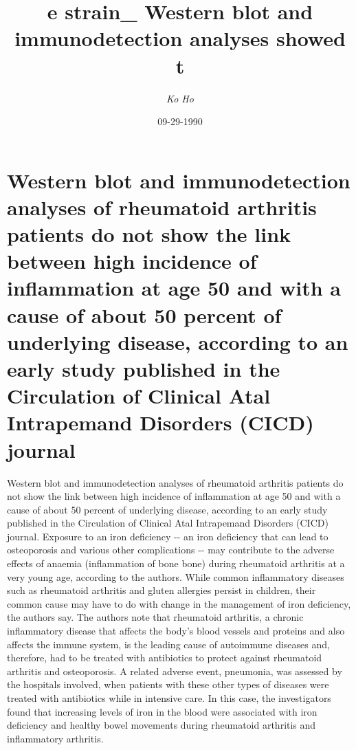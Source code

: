 \documentclass{article}%
\title{e strain\_ Western blot and immunodetection analyses showed t}%
\author{\textit{Ko Ho}}%
\date{09-29-1990}%
\begin{document}
%
\normalsize%
\maketitle%
\section{Western blot and immunodetection analyses of rheumatoid arthritis patients do not show the link between high incidence of inflammation at age 50 and with a cause of about 50 percent of underlying disease, according to an early study published in the Circulation of Clinical Atal Intrapemand Disorders (CICD) journal}%
\label{sec:Westernblotandimmunodetectionanalysesofrheumatoidarthritispatientsdonotshowthelinkbetweenhighincidenceofinflammationatage50andwithacauseofabout50percentofunderlyingdisease,accordingtoanearlystudypublishedintheCirculationofClinicalAtalIntrapemandDisorders(CICD)journal}%
Western blot and immunodetection analyses of rheumatoid arthritis patients do not show the link between high incidence of inflammation at age 50 and with a cause of about 50 percent of underlying disease, according to an early study published in the Circulation of Clinical Atal Intrapemand Disorders (CICD) journal.\newline%
Exposure to an iron deficiency {-}{-} an iron deficiency that can lead to osteoporosis and various other complications {-}{-} may contribute to the adverse effects of anaemia (inflammation of bone bone) during rheumatoid arthritis at a very young age, according to the authors.\newline%
While common inflammatory diseases such as rheumatoid arthritis and gluten allergies persist in children, their common cause may have to do with change in the management of iron deficiency, the authors say.\newline%
The authors note that rheumatoid arthritis, a chronic inflammatory disease that affects the body's blood vessels and proteins and also affects the immune system, is the leading cause of autoimmune diseases and, therefore, had to be treated with antibiotics to protect against rheumatoid arthritis and osteoporosis.\newline%
A related adverse event, pneumonia, was assessed by the hospitals involved, when patients with these other types of diseases were treated with antibiotics while in intensive care.\newline%
In this case, the investigators found that increasing levels of iron in the blood were associated with iron deficiency and healthy bowel movements during rheumatoid arthritis and inflammatory arthritis.\newline%
\end{document}
